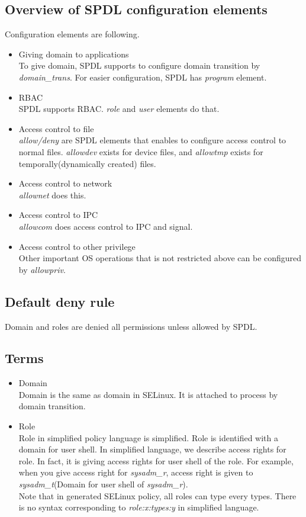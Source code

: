 \documentclass{article}
\begin{document}
\subsection{Overview of SPDL configuration elements}
Configuration elements are following.
\begin{itemize}
 \item Giving domain to applications\\
       To give domain, SPDL  supports to configure domain transition by
       {\it domain\_trans}. For easier configuration, SPDL has {\it
       program} element.
 \item RBAC\\
       SPDL supports RBAC. {\it role} and {\it user} elements do that.
 \item Access control to file\\       
       {\it allow/deny} are SPDL elements that enables to configure
       access control to normal files. {\it allowdev} exists for device
       files, and {\it allowtmp} exists for temporally(dynamically
       created) files.
 \item Access control to network\\
       {\it allownet} does this.
 \item Access control to IPC\\
       {\it allowcom} does access control to IPC and signal.
 \item Access control to other privilege\\
       Other important OS operations that is not restricted above can be
       configured by {\it allowpriv}.
\end{itemize}

\subsection{Default deny rule}
Domain and roles are denied all permissions unless allowed by SPDL.

\subsection{Terms}
\begin{itemize}
\item Domain \\
 Domain is the same as domain in SELinux. It is attached to process by domain transition.
\item Role\\
 Role in simplified policy language is simplified. Role is identified
      with a domain for user shell. In simplified language, we describe access
      rights for role. In fact, it is giving access rights for user
      shell of the role. For example, when you give access right for
      {\it sysadm\_r}, access right is given to 
{\it sysadm\_t}(Domain for user shell of {\it sysadm\_r}).\\
 Note that in generated SELinux policy, all roles can type every types.
      There is no syntax corresponding to {\it role:x:types:y} in simplified language.
\end{itemize}                  
\end{document}
